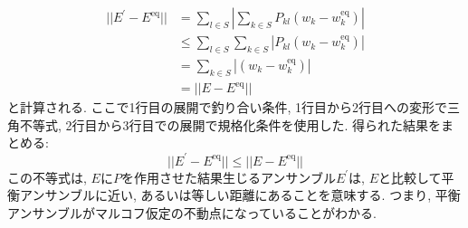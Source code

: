 \begin{align}
    || E^{\prime} - E^{\mathrm{eq}} ||
    &=
    \sum_{l \in S}
    \left| \sum_{k \in S} P_{kl} (w_{k} - w_{k}^{\mathrm{eq}}) \right| \\
    &\le
    \sum_{l \in S} \sum_{k \in S}
    \left| P_{kl} (w_{k} - w_{k}^{\mathrm{eq}}) \right| \\
    &=
    \sum_{k \in S} \left| (w_{k} - w_{k}^{\mathrm{eq}}) \right| \\
    &=
    || E - E^{\mathrm{eq}} ||
\end{align}
と計算される.
ここで1行目の展開で釣り合い条件, 1行目から2行目への変形で三角不等式, 2行目から3行目での展開で規格化条件を使用した.
得られた結果をまとめる:
\begin{equation}
    || E^{\prime} - E^{\mathrm{eq}} || \le || E - E^{\mathrm{eq}} ||
\end{equation}
この不等式は, $E$に$P$を作用させた結果生じるアンサンブル$E^{\prime}$は, $E$と比較して平衡アンサンブルに近い, あるいは等しい距離にあることを意味する.
つまり, 平衡アンサンブルがマルコフ仮定の不動点になっていることがわかる.

